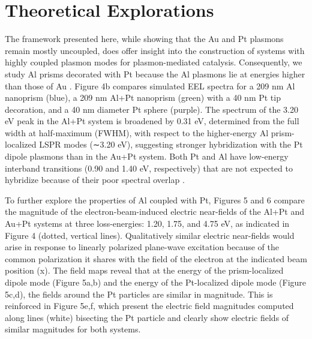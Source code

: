 \documentclass [11pt, proquest] {uwthesis}[2016/11/22]
\begin{document}
\section{Theoretical Explorations}
The framework presented here, while showing that the Au and Pt plasmons remain mostly uncoupled, does offer insight into the construction of systems with highly coupled plasmon modes for plasmon-mediated catalysis. Consequently, we study Al prisms \cite{Aluminum,AluminumHydrogen} decorated with Pt because the Al plasmons lie at energies higher than those of Au \cite{NordHalAluminum}. Figure 4b compares simulated EEL spectra for a 209 nm Al nanoprism (blue), a 209 nm Al+Pt nanoprism (green) with a 40 nm Pt tip decoration, and a 40 nm diameter Pt sphere (purple). The spectrum of the 3.20 eV peak in the Al+Pt system is broadened by 0.31 eV, determined from the full width at half-maximum (FWHM), with respect to the higher-energy Al prism-localized LSPR modes (∼3.20 eV), suggesting stronger hybridization with the Pt dipole plasmons than in the Au+Pt system. Both Pt and Al have low-energy interband transitions (0.90 and 1.40 eV, respectively) that are not expected to hybridize because of their poor spectral overlap \cite{Segall}.

To further explore the properties of Al coupled with Pt, Figures 5 and 6 compare the magnitude of the electron-beam-induced electric near-fields of the Al+Pt and Au+Pt systems at three loss-energies: 1.20, 1.75, and 4.75 eV, as indicated in Figure 4 (dotted, vertical lines). Qualitatively similar electric near-fields would arise in response to linearly polarized plane-wave excitation because of the common polarization it shares with the field of the electron at the indicated beam position (x). The field maps reveal that at the energy of the prism-localized dipole mode (Figure 5a,b) and the energy of the Pt-localized dipole mode (Figure 5c,d), the fields around the Pt particles are similar in magnitude. This is reinforced in Figure 5e,f, which present the electric field magnitudes computed along lines (white) bisecting the Pt particle and clearly show electric fields of similar magnitudes for both systems.
\end{document}
